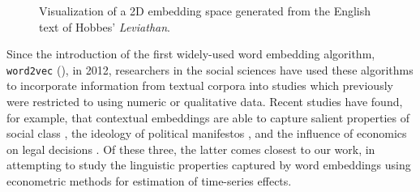 \documentclass[11pt]{article}
\begin{document}


\begin{figure}[ht!]
	\centering
	
	\caption{Visualization of a 2D embedding space generated from the English text of Hobbes' \textit{Leviathan}.}
	\label{fig:lev-embeddings}
\end{figure}

Since the introduction of the first widely-used word embedding algorithm, \texttt{word2vec} (\cite{mikolov_distributed_2013}), in 2012, researchers in the social sciences have used these algorithms to incorporate information from textual corpora into studies which previously were restricted to using numeric or qualitative data. Recent studies have found, for example, that contextual embeddings are able to capture salient properties of social class \parencite{kozlowski_geometry_2019}, the ideology of political manifestos \parencite{rheault_word_2020}, and the influence of economics on legal decisions \parencite{ash_ideas_2017}. Of these three, the latter comes closest to our work, in attempting to study the linguistic properties captured by word embeddings using econometric methods for estimation of time-series effects.
\end{document}
